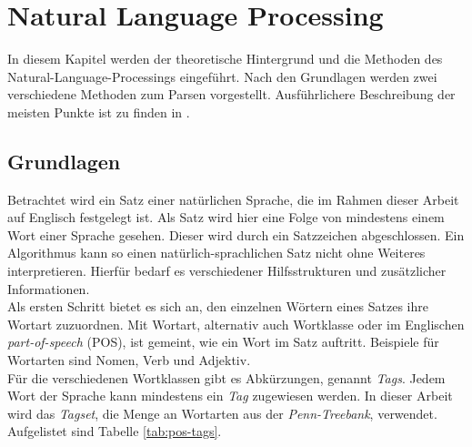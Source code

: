%
\chapter{Natural Language Processing}
\label{sec:nlp}
In diesem Kapitel werden der theoretische Hintergrund und die Methoden des Natural-Language-Processings eingeführt. Nach den Grundlagen werden zwei verschiedene Methoden zum Parsen vorgestellt. Ausführlichere Beschreibung der meisten Punkte ist zu finden in \cite{nlpGrundlagen}.

\section{Grundlagen}
\label{sec:nlp:grundlagen}

Betrachtet wird ein Satz einer natürlichen Sprache, die im Rahmen dieser Arbeit auf Englisch festgelegt ist. Als Satz wird hier eine Folge von mindestens einem Wort einer Sprache gesehen. Dieser wird durch ein Satzzeichen abgeschlossen.
Ein Algorithmus kann so einen natürlich-sprachlichen Satz nicht ohne Weiteres interpretieren. Hierfür bedarf es verschiedener Hilfsstrukturen und zusätzlicher Informationen.\\
Als ersten Schritt bietet es sich an, den einzelnen Wörtern eines Satzes ihre Wortart zuzuordnen. Mit Wortart, alternativ auch Wortklasse oder im Englischen \textit{part-of-speech} (POS), ist gemeint, wie ein Wort im Satz auftritt. Beispiele für Wortarten sind Nomen, Verb und Adjektiv. \\
Für die verschiedenen Wortklassen gibt es Abkürzungen, genannt \textit{Tags}. Jedem Wort der Sprache kann mindestens ein \textit{Tag} zugewiesen werden. In dieser Arbeit wird das \textit{Tagset}, die Menge an Wortarten aus der \textit{Penn-Treebank}, verwendet. Aufgelistet sind  Tabelle \ref{tab:pos-tags}. %

